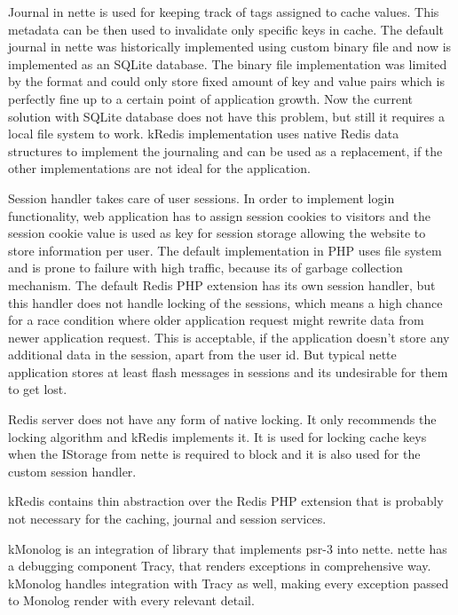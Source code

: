 Journal in \gls{nette} is used for keeping track of tags assigned to cache values. This metadata can be then used to invalidate only specific keys in cache. The default journal in \gls{nette} was historically implemented using custom binary file and now is implemented as an SQLite database. The binary file implementation was limited by the format and could only store fixed amount of key and value pairs which is perfectly fine up to a certain point of application growth. Now the current solution with SQLite database does not have this problem, but still it requires a local file system to work. \gls{kRedis} implementation uses native Redis data structures to implement the journaling and can be used as a replacement, if the other implementations are not ideal for the application.

Session handler takes care of user sessions. In order to implement login functionality, web application has to assign session cookies to visitors and the session cookie value is used as key for session storage allowing the website to store information per user. The default implementation in PHP uses file system and is prone to failure with high traffic, because its of garbage collection mechanism. The default Redis PHP extension has its own session handler, but this handler does not handle locking of the sessions, which means a high chance for a race condition where older application request might rewrite data from newer application request. This is acceptable, if the application doesn't store any additional data in the session, apart from the user id. But typical \gls{nette} application stores at least flash messages in sessions and its undesirable for them to get lost.

Redis server does not have any form of native locking. It only recommends the locking algorithm  and \gls{kRedis} implements it.
It is used for locking cache keys when the IStorage from \gls{nette} is required to block and it is also used for the custom session handler.

\gls{kRedis} contains thin abstraction over the Redis PHP extension that is probably not necessary for the caching, journal and session services.

 \label{sec:state:monolog}

\gls{kMonolog} is an integration of  library that implements \gls{psr}-3 into \gls{nette}. \Gls{nette} has a debugging component Tracy, that renders exceptions in comprehensive way. \gls{kMonolog} handles integration with Tracy as well, making every exception passed to Monolog render with every relevant detail.

